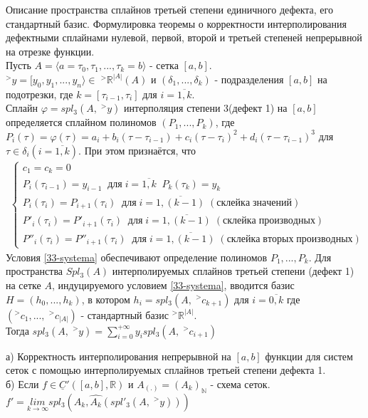 \documentclass[__main__.tex]{subfiles}
\begin{document}
Описание пространства сплайнов третьей степени единичного дефекта, его стандартный базис. Формулировка теоремы о корректности интерполирования дефектными сплайнами нулевой, первой, второй и третьей степеней непрерывной на отрезке функции.\\

Пусть $A = \langle a = \tau_0, \tau_1, ..., \tau_k = b\rangle$ - сетка $[a, b]$.\\
$^>y = [y_0, y_1, ..., y_n\rangle \in\;^>\mathbb{R}^{|A|}(A)$ и $(\delta_1, ..., \delta_k)$ - подразделения $[a, b]$ на подотрезки, где $k = [\tau_{i-1}, \tau_i]$ для $i = \overline{1, k}$.\\
Сплайн $\varphi = spl_3(A, \;^>y)$ интерполяция степени 3(дефект 1) на $[a, b]$ определяется сплайном полиномов $(P_1, ..., P_k)$, где $P_i(\tau) = \varphi(\tau) = a_i + b_i(\tau - \tau_{i-1}) + c_i(\tau - \tau_i)^2 + d_i(\tau - \tau_{i-1})^3$ для $\tau \in \delta_i(i = \overline{1, k})$.
При этом признаётся, что 
\begin{gather}
\begin{cases}
	c_1 = c_k = 0\\
	P_i(\tau_{i-1}) = y_{i-1} \;\; для\; i = \overline{1, k}\;\; P_k(\tau_k) = y_k\\
	P_i(\tau_i) = P_{i+1}(\tau_i) \;\; для\; i = \overline{1, (k-1)}\; (склейка\; значений)\\
	P'_i(\tau_i) = P'_{i+1}(\tau_i) \;\; для\; i = \overline{1, (k-1)}\; (склейка\; производных)\\
	P''_i(\tau_i) = P''_{i+1}(\tau_i) \;\; для\; i = \overline{1, (k-1)}\; (склейка\; вторых\; производных)
\end{cases}
\label{33-systema}
\end{gather}
Условия \ref{33-systema} обеспечивают определение полиномов $P_1, ..., P_k$. Для пространства $Spl_3(A)$ интерполируемых сплайнов третьей степени (дефект 1) на сетке $A$, индуцируемого условием \ref{33-systema}, вводится базис $H = (h_0, ..., h_k)$, в котором $h_i = spl_3(A, \;^>c_{k+1})$ для $i = \overline{0, k}$ где $(^>c_1, ..., \;^>c_{|A|})$ - стандартный базис $^>\mathbb{R}^{|A|}$.\\
Тогда $spl_3(A,\; ^>y) = \sum_{i=0}^{+\infty}{y_ispl_3(A, \;^>c_{i+1})}$
\begin{theorem}
	а) Корректность интерполирования непрерывной на $[a, b]$ функции для систем сеток с помощью интерполируемых сплайнов третьей степени дефекта 1.\\
	б) Если $f \in \underline{C}'([a, b], \mathbb{R})$ и $A_{(.)} = (A_k)_{\mathbb
	{N}}$ - схема сеток.\\
	$f' = \underset{k \rightarrow \infty}{lim}{spl_3}(A_k, \hat{A_k}(spl'_3(A, \;^>y)))$
\end{theorem}
\end{document}
